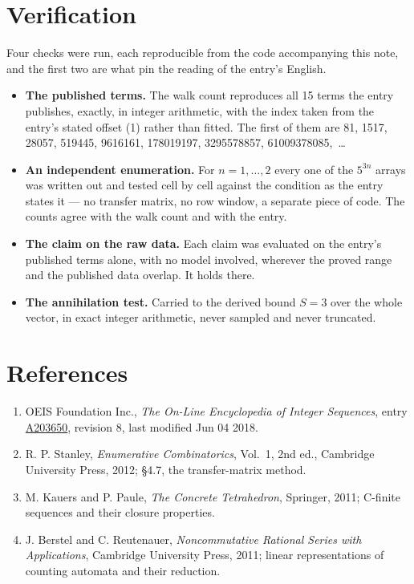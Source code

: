 \documentclass[11pt]{article}
\theoremstyle{definition}
\begin{document}
\section{Verification}

Four checks were run, each reproducible from the code accompanying this note, and the first two are what pin the reading of the entry's English.

\begin{itemize}

\item {\bfseries The published terms.} The walk count reproduces all 15 terms the entry publishes, exactly, in integer arithmetic, with the index taken from the entry's stated offset (1) rather than fitted. The first of them are 81, 1517, 28057, 519445, 9616161, 178019197, 3295578857, 61009378085,~\dots

\item {\bfseries An independent enumeration.} For $n = 1,\dots,2$ every one of the $5^{3n}$ arrays was written out and tested cell by cell against the condition as the entry states it --- no transfer matrix, no row window, a separate piece of code. The counts agree with the walk count and with the entry.

\item {\bfseries The claim on the raw data.} Each claim was evaluated on the entry's published terms alone, with no model involved, wherever the proved range and the published data overlap. It holds there.

\item {\bfseries The annihilation test.} Carried to the derived bound $S = 3$ over the whole vector, in exact integer arithmetic, never sampled and never truncated.

\end{itemize}

\section{References}

\begin{enumerate}

\item OEIS Foundation Inc., \emph{The On-Line Encyclopedia of Integer Sequences}, entry \href{https://oeis.org/A203650}{A203650}, revision 8, last modified Jun 04 2018.

\item R. P. Stanley, \emph{Enumerative Combinatorics}, Vol.~1, 2nd ed., Cambridge University Press, 2012; \S4.7, the transfer-matrix method.

\item M. Kauers and P. Paule, \emph{The Concrete Tetrahedron}, Springer, 2011; C-finite sequences and their closure properties.

\item J. Berstel and C. Reutenauer, \emph{Noncommutative Rational Series with Applications}, Cambridge University Press, 2011; linear representations of counting automata and their reduction.

\end{enumerate}
\end{document}

